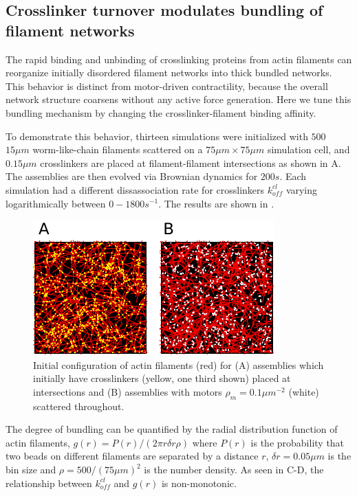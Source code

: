\documentclass[12pt]{article}
\begin{document}
\subsection{Crosslinker turnover modulates bundling of filament networks}
The rapid binding and unbinding of crosslinking proteins from actin
filaments can reorganize initially disordered filament networks into 
thick bundled networks. This behavior is distinct from motor-driven 
contractility, because the overall network structure coarsens without
any active force generation. Here we tune this bundling mechanism by
changing the crosslinker-filament binding affinity. 
\par
To demonstrate this behavior, thirteen simulations were initialized with $500$ 
$15\mu m$ worm-like-chain filaments scattered on a $75\mu m\times 75\mu m$ 
simulation cell, and $0.15\mu m$ crosslinkers are placed at filament-filament 
intersections as shown in A. The assemblies are then evolved via 
Brownian dynamics for $200s$. Each simulation had a different dissassociation 
rate for crosslinkers $k_{off}^{cl}$ varying logarithmically between 
$0-1800 s^{-1}$. The results are shown in . 
\par
\begin{figure}[H] 
  \centering
  \includegraphics[scale=1.2]{figs/t0.pdf}
  \caption{\label{fig:t0}Initial configuration of actin filaments (red) for 
  (A) assemblies which initially have crosslinkers (yellow, one third shown) placed at intersections and 
  (B) assemblies with motors $\rho_m=0.1\mu m^{-2}$ (white) scattered throughout. 
  }
\end{figure}
The degree of bundling can be quantified by the radial
distribution function of actin filaments, $g(r) = P(r)/(2\pi r \delta r\rho)$ 
where $P(r)$ is the probability that two beads on different filaments are 
separated by a distance $r$, $\delta r =0.05 \mu m$ is the bin size and 
$\rho = 500/(75\mu m)^2$ is the number density. As seen in C-D,
the relationship between $k_{off}^{cl}$ and $g(r)$ is non-monotonic. 
\end{document}
